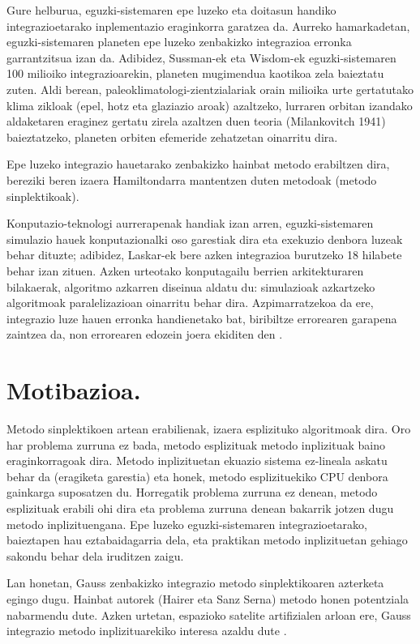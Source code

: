 Gure helburua, eguzki-sistemaren epe luzeko eta doitasun handiko integrazioetarako inplementazio eraginkorra garatzea da. Aurreko hamarkadetan, eguzki-sistemaren planeten epe luzeko zenbakizko integrazioa erronka garrantzitsua izan da. Adibidez, Sussman-ek eta Wisdom-ek  eguzki-sistemaren 100 milioiko integrazioarekin, planeten mugimendua kaotikoa zela baieztatu zuten. Aldi berean, paleoklimatologi-zientzialariak orain milioika urte gertatutako klima zikloak (epel, hotz eta glaziazio aroak) azaltzeko, lurraren orbitan izandako aldaketaren eraginez gertatu zirela azaltzen duen teoria (Milankovitch 1941) \cite{Berger2012} baieztatzeko, planeten orbiten efemeride zehatzetan oinarritu dira.        

Epe luzeko integrazio hauetarako zenbakizko hainbat metodo erabiltzen dira, bereziki beren izaera Hamiltondarra mantentzen duten metodoak (metodo sinplektikoak).

Konputazio-teknologi aurrerapenak handiak izan arren, eguzki-sistemaren simulazio hauek konputazionalki oso garestiak dira eta exekuzio denbora luzeak behar dituzte; adibidez, Laskar-ek  bere azken integrazioa burutzeko 18 hilabete behar izan zituen.
Azken urteotako konputagailu berrien arkitekturaren bilakaerak, algoritmo azkarren diseinua aldatu du: simulazioak azkartzeko algoritmoak paralelizazioan oinarritu behar dira. Azpimarratzekoa da ere, integrazio luze hauen erronka handienetako bat, biribiltze errorearen garapena zaintzea da, non errorearen edozein joera ekiditen den \cite{Laskar2015}.
 

\section{Motibazioa.}
\label{intro}


Metodo sinplektikoen artean erabilienak, izaera esplizituko algoritmoak dira. Oro har problema zurruna ez bada, metodo esplizituak  metodo inplizituak baino eraginkorragoak dira. Metodo inplizituetan ekuazio sistema ez-lineala askatu behar da (eragiketa garestia) eta honek, metodo esplizituekiko CPU denbora gainkarga suposatzen du. Horregatik problema zurruna ez denean, metodo esplizituak erabili ohi dira eta problema zurruna denean bakarrik jotzen dugu metodo inplizituengana. Epe luzeko eguzki-sistemaren integrazioetarako, baieztapen hau eztabaidagarria dela, eta praktikan metodo inplizituetan gehiago sakondu behar dela iruditzen zaigu. 

Lan honetan, Gauss zenbakizko integrazio metodo sinplektikoaren azterketa egingo dugu. Hainbat autorek (Hairer \cite{Hairer2006}\cite{Hairer2008} eta Sanz Serna\cite{JMSanz-Serna1994}) metodo honen potentziala nabarmendu dute. Azken urtetan, espazioko satelite artifizialen arloan ere, Gauss integrazio metodo inplizituarekiko interesa azaldu dute \cite{Bradley2014}\cite{Beylkin2014}. 


